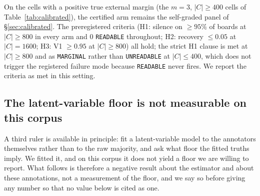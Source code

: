 \documentclass{article}
\newcommand{\ids}[1]{\texttt{\small #1}} %
\begin{document}
On the cells with a positive true external margin (the $m=3$, $|C| \geq 400$ cells of
Table~\ref{tab:calibrated}), the certified arm remains the self-graded panel of
\S\ref{sec:calibrated}. The preregistered criteria (H1: silence on $\geq 95\%$ of
boards at $|C| \geq 800$ in every arm and 0 \texttt{READABLE} throughout; H2: recovery
$\leq 0.05$ at $|C|=1600$; H3: V1 $\geq 0.95$ at $|C| \geq 800$) all hold; the
strict H1 clause is met at $|C| \geq 800$ and as \texttt{MARGINAL} rather than
\texttt{UNREADABLE} at $|C| \leq 400$, which does not trigger the registered failure
mode because \texttt{READABLE} never fires. We report the criteria as met in this setting.

\begin{table}[htbp]
\centering\small

\caption{The disjoint-field deployment on AgentJudgeBench (\S\ref{sec:ajb}). Each row
is a preregistered cell ($m$ judges, $k$ contestants, $|C|$ items; 200 resampled
boards at $\delta = 0.05$, primary pools). The judge--contestant pools share no
members; the true margin is the best contestant minus the best judge against the
embedded programmatic truth. \emph{uncorr.} is the same point margin computed without the
calibration; \emph{placebo} is the transfer check, the median absolute residual left when the
correction is fitted on one half of the item pool and applied to the other. All margins are in
points; AUC is printed with its 95\% bootstrap interval and is undefined where a cell has no
``wrong top'' to separate. Regenerated from
\ids{evidence/calibrated/p4\_ajb.json} and \ids{p4\_ajb\_withgt.json}, computed from
the per-board carrier by \ids{calibrated\_floor.py}.}
\label{tab:ajb}
\end{table}

\subsection{The latent-variable floor is not measurable on this corpus}
\label{sec:ds} A third ruler is available in principle: fit a latent-variable model to the annotators themselves rather than to the raw majority, and ask what floor the fitted truths imply. We fitted it, and on this corpus it does not yield a floor we are willing to report. What follows is therefore a negative result about the estimator and about these annotations, not a measurement of the floor, and we say so before giving any number so that no value below is cited as one.
\end{document}
